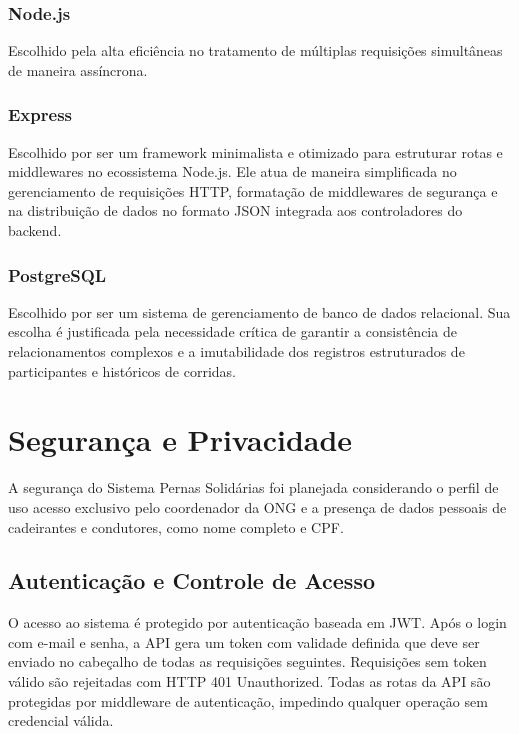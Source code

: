 \documentclass[12pt,a4paper]{article}
\begin{document}
\subsubsection{Node.js}
Escolhido pela alta eficiência no tratamento de múltiplas requisições simultâneas de maneira assíncrona.

\subsubsection{Express}
Escolhido por ser um framework minimalista e otimizado para estruturar rotas e middlewares no ecossistema Node.js. Ele atua de maneira simplificada no gerenciamento de requisições HTTP, formatação de middlewares de segurança e na distribuição de dados no formato JSON integrada aos controladores do backend.

\subsubsection{PostgreSQL}
Escolhido por ser um sistema de gerenciamento de banco de dados relacional. Sua escolha é justificada pela necessidade crítica de garantir a consistência de relacionamentos complexos e a imutabilidade dos registros estruturados de participantes e históricos de corridas.

\section{Segurança e Privacidade}

A segurança do Sistema Pernas Solidárias foi planejada considerando o perfil de uso acesso exclusivo pelo coordenador da ONG e a presença de dados pessoais de cadeirantes e condutores, como nome completo e CPF.

\subsection{Autenticação e Controle de Acesso}

O acesso ao sistema é protegido por autenticação baseada em JWT. Após o login com e-mail e senha, a API gera um token com validade definida que deve ser enviado no cabeçalho de todas as requisições seguintes. Requisições sem token válido são rejeitadas com HTTP 401 Unauthorized. Todas as rotas da API são protegidas por middleware de autenticação, impedindo qualquer operação sem credencial válida. 
\end{document}
